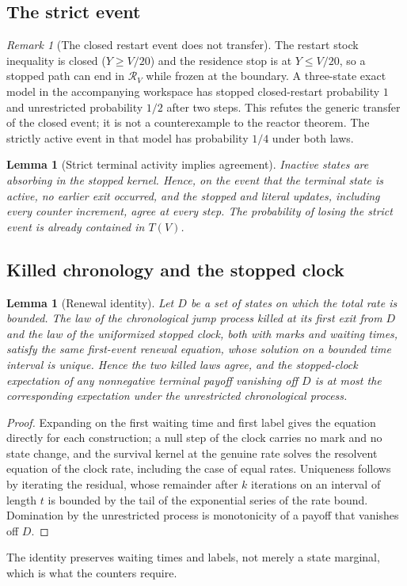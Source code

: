 \documentclass[11pt,a4paper]{article}
\theoremstyle{plain}
\newtheorem{lemma}[theorem]{Lemma}
\theoremstyle{definition}
\theoremstyle{remark}
\newtheorem{remark}[theorem]{Remark}
\newcommand{\cR}{\mathcal R}
\begin{document}
\subsection{The strict event}
\begin{remark}[The closed restart event does not transfer]\label{rem:boundary}
The restart stock inequality is closed ($Y\ge V/20$) and the residence stop is at $Y\le V/20$, so a stopped path can end in $\cR_V$ while frozen at the boundary. A three-state exact model in the accompanying workspace has stopped closed-restart probability $1$ and unrestricted probability $1/2$ after two steps. This refutes the generic transfer of the closed event; it is not a counterexample to the reactor theorem. The strictly active event in that model has probability $1/4$ under both laws.
\end{remark}
\begin{lemma}[Strict terminal activity implies agreement]\label{lem:strict}
Inactive states are absorbing in the stopped kernel. Hence, on the event that the terminal state is active, no earlier exit occurred, and the stopped and literal updates, including every counter increment, agree at every step. The probability of losing the strict event is already contained in $T(V)$.
\end{lemma}

\subsection{Killed chronology and the stopped clock}
\begin{lemma}[Renewal identity]\label{lem:renewal}
Let $D$ be a set of states on which the total rate is bounded. The law of the chronological jump process killed at its first exit from $D$ and the law of the uniformized stopped clock, both with marks and waiting times, satisfy the same first-event renewal equation, whose solution on a bounded time interval is unique. Hence the two killed laws agree, and the stopped-clock expectation of any nonnegative terminal payoff vanishing off $D$ is at most the corresponding expectation under the unrestricted chronological process.
\end{lemma}
\begin{proof}
Expanding on the first waiting time and first label gives the equation directly for each construction; a null step of the clock carries no mark and no state change, and the survival kernel at the genuine rate solves the resolvent equation of the clock rate, including the case of equal rates. Uniqueness follows by iterating the residual, whose remainder after $k$ iterations on an interval of length $t$ is bounded by the tail of the exponential series of the rate bound. Domination by the unrestricted process is monotonicity of a payoff that vanishes off $D$.
\end{proof}
The identity preserves waiting times and labels, not merely a state marginal, which is what the counters require.
\end{document}
